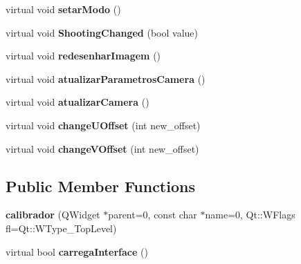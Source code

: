 \begin{DoxyCompactItemize}
\item 
virtual void {\bfseries setar\+Modo} ()\hypertarget{classcalibrador_a95937f5fa5bf8f8ec1bc3be4c4b96913}{}\label{classcalibrador_a95937f5fa5bf8f8ec1bc3be4c4b96913}

\item 
virtual void {\bfseries Shooting\+Changed} (bool value)\hypertarget{classcalibrador_af84782ee840f14b60a9bb3e9f93e5fc0}{}\label{classcalibrador_af84782ee840f14b60a9bb3e9f93e5fc0}

\item 
virtual void {\bfseries redesenhar\+Imagem} ()\hypertarget{classcalibrador_a246383dfb3b240c1a13be29f87b57635}{}\label{classcalibrador_a246383dfb3b240c1a13be29f87b57635}

\item 
virtual void {\bfseries atualizar\+Parametros\+Camera} ()\hypertarget{classcalibrador_ae0854461a01d5bb7f1b8f7ea9f1b5e59}{}\label{classcalibrador_ae0854461a01d5bb7f1b8f7ea9f1b5e59}

\item 
virtual void {\bfseries atualizar\+Camera} ()\hypertarget{classcalibrador_aa10b31f8b5ebdd10495bc18856d75ac9}{}\label{classcalibrador_aa10b31f8b5ebdd10495bc18856d75ac9}

\item 
virtual void {\bfseries change\+U\+Offset} (int new\+\_\+offset)\hypertarget{classcalibrador_ad88815ea14c4e6d91a0dffad666ed22d}{}\label{classcalibrador_ad88815ea14c4e6d91a0dffad666ed22d}

\item 
virtual void {\bfseries change\+V\+Offset} (int new\+\_\+offset)\hypertarget{classcalibrador_a72b45950e84caaa1924421a721e1ee67}{}\label{classcalibrador_a72b45950e84caaa1924421a721e1ee67}

\end{DoxyCompactItemize}
\subsection*{Public Member Functions}
\begin{DoxyCompactItemize}
\item 
{\bfseries calibrador} (Q\+Widget $\ast$parent=0, const char $\ast$name=0, Qt\+::\+W\+Flags fl=Qt\+::\+W\+Type\+\_\+\+Top\+Level)\hypertarget{classcalibrador_a65f8f9f824370eee736b95fd0b1690fc}{}\label{classcalibrador_a65f8f9f824370eee736b95fd0b1690fc}

\item 
virtual bool {\bfseries carrega\+Interface} ()\hypertarget{classcalibrador_aba6db773c9f88aadb2648f4dd2ccc04a}{}\label{classcalibrador_aba6db773c9f88aadb2648f4dd2ccc04a}

\end{DoxyCompactItemize}
